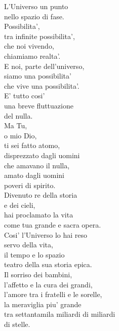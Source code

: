 \begin{haiku}
    L'Universo un punto\\
    nello spazio di fase.\\
    Possibilita',\\
    tra infinite possibilita',\\
    che noi vivendo,\\
    chiamiamo realta'.\\
    E noi, parte dell'universo,\\
    siamo una possibilita'\\
    che vive una possibilita'.\\
    E' tutto cosi' \\
    una breve fluttuazione \\
    del nulla.\\
    Ma Tu,\\
    o mio Dio,\\
    ti sei fatto atomo,\\
    disprezzato dagli uomini\\
    che amavano il nulla,\\
    amato dagli uomini\\
    poveri di spirito.\\
    Divenuto re della storia\\
    e dei cieli,\\
    hai proclamato la vita \\
    come tua grande e sacra opera.\\
    Cosi' l'Universo lo hai reso\\
    servo della vita,\\
    il tempo e lo spazio\\
    teatro della sua storia epica.\\
    Il sorriso dei bambini,\\
    l'affetto e la cura dei grandi,\\
    l'amore tra i fratelli e le sorelle,\\
    la meraviglia piu' grande\\
    tra settantamila miliardi di miliardi\\
    di stelle.\\
\end{haiku}

